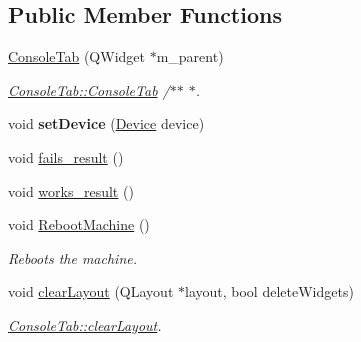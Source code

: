 \subsection*{Public Member Functions}
\begin{DoxyCompactItemize}
\item 
\hyperlink{classConsoleTab_a2c631d14f9fe5957e0622e10269e5115}{Console\+Tab} (Q\+Widget $\ast$m\+\_\+parent)
\begin{DoxyCompactList}\small\item\em \hyperlink{classConsoleTab_a2c631d14f9fe5957e0622e10269e5115}{Console\+Tab\+::\+Console\+Tab} /$\ast$$\ast$ $\ast$. \end{DoxyCompactList}\item 
\mbox{\label{classConsoleTab_aa2b97a380a10d6100dc956d150ebd590}} 
void {\bfseries set\+Device} (\hyperlink{classDevice}{Device} device)
\item 
void \hyperlink{classConsoleTab_a7b2d0987db00c8b9af7ece7b36a82624}{fails\+\_\+result} ()
\item 
void \hyperlink{classConsoleTab_a866367073a3150527988f7cb841d5002}{works\+\_\+result} ()
\item 
\mbox{\label{classConsoleTab_a312dd40624d78a7d8506f97eb837c492}} 
void \hyperlink{classConsoleTab_a312dd40624d78a7d8506f97eb837c492}{Reboot\+Machine} ()
\begin{DoxyCompactList}\small\item\em Reboots the machine. \end{DoxyCompactList}\item 
void \hyperlink{classConsoleTab_aae70e23b23e401b219edefcac4882eaf}{clear\+Layout} (Q\+Layout $\ast$layout, bool delete\+Widgets)
\begin{DoxyCompactList}\small\item\em \hyperlink{classConsoleTab_aae70e23b23e401b219edefcac4882eaf}{Console\+Tab\+::clear\+Layout}. \end{DoxyCompactList}\end{DoxyCompactItemize}
